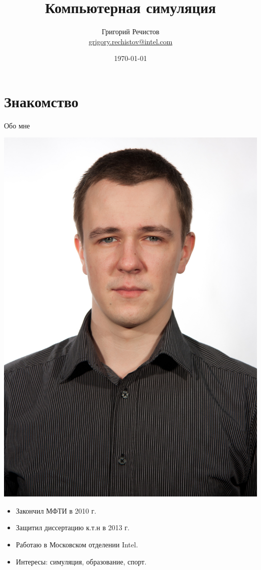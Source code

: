 \documentclass{beamer}
\title{Компьютерная симуляция }
\author[Григорий Речистов]{Григорий Речистов \\ \small{\href{mailto:grigory.rechistov@intel.com}{grigory.rechistov@intel.com}}}
\date{\today}
\begin{document}
\begin{frame}
\titlepage
\end{frame}

\begin{frame}
\tableofcontents
\end{frame} 

\section{Знакомство}

\begin{frame}{Обо мне}

\raggedleft \includegraphics[height=0.3\textheight]{./grigory-rechistov}

\begin{itemize}
\item Закончил МФТИ в 2010 г.
\item Защитил диссертацию к.т.н в 2013 г.
\item Работаю в Московском отделении Intel.
\item Интересы: симуляция, образование, спорт.
\end{itemize}
\end{frame} 
\end{document}
